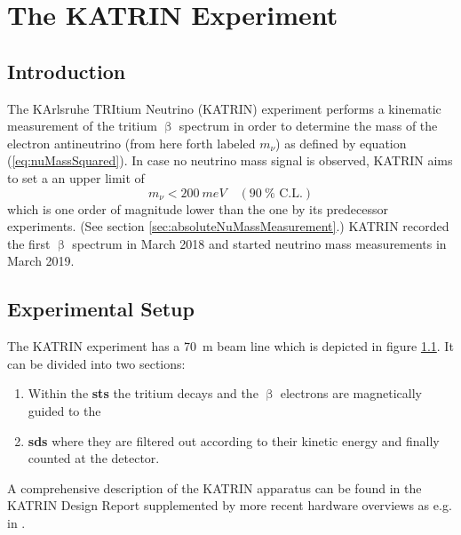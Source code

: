 
\chapter{The KATRIN Experiment}
    \section{Introduction}
    The KArlsruhe TRItium Neutrino (KATRIN) experiment performs a kinematic measurement of the tritium $\upbeta$ spectrum in order to determine the mass of the electron antineutrino (from here forth labeled $m_\nu$) as defined by equation (\ref{eq:nuMassSquared}). In case no neutrino mass signal is observed, KATRIN aims to set a an upper limit of
    \begin{equation*}
        m_\nu < \SI{200}{meV} \quad (\SI{90}{\percent} \text{ C.L.})
    \end{equation*}
    which is one order of magnitude lower than the one by its predecessor experiments. (See section \ref{sec:absoluteNuMassMeasurement}.)
    KATRIN recorded the first $\upbeta$ spectrum in March 2018 and started neutrino mass measurements in March 2019.
    
    \section{Experimental Setup}
    \begin{figure}[t]
	    \label{fig:beamline}
    \end{figure}
    The KATRIN experiment has a \SI{70}{m} beam line which is depicted in figure \ref{fig:beamline}. It can be divided into two sections: 
    \begin{enumerate}
        \item Within the \textbf{\gls{sts}} the tritium decays and the $\upbeta$ electrons are magnetically guided to the 
        \item \textbf{\gls{sds}} where they are filtered out according to their kinetic energy and finally counted at the detector.
    \end{enumerate}
    A comprehensive description of the KATRIN apparatus can be found in the KATRIN Design Report \cite{Angrik:2005ep} supplemented by more recent hardware overviews as e.g. in \cite{SeitzM2019}.
    
